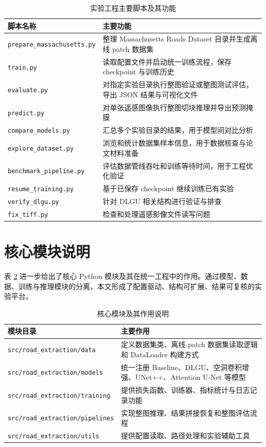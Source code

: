 \begin{table}[htbp]
\centering
\caption{实验工程主要脚本及其功能}
\label{tab:v2-script-summary}
\begin{tabular}{p{4.0cm}p{9.0cm}}
\toprule
脚本名称 & 主要功能 \\
\midrule
\texttt{prepare\_massachusetts.py} & 整理 Massachusetts Roads Dataset 目录并生成离线 patch 数据集 \\
\texttt{train.py} & 读取配置文件并启动统一训练流程，保存 checkpoint 与训练历史 \\
\texttt{evaluate.py} & 对指定实验目录执行整图验证或整图测试评估，导出 JSON 结果与可视化文件 \\
\texttt{predict.py} & 对单张遥感图像执行整图切块推理并导出预测掩膜 \\
\texttt{compare\_models.py} & 汇总多个实验目录的结果，用于模型间对比分析 \\
\texttt{explore\_dataset.py} & 浏览和统计数据集样本信息，用于数据核查与论文材料准备 \\
\texttt{benchmark\_pipeline.py} & 评估数据管线吞吐和训练等待时间，用于工程优化验证 \\
\texttt{resume\_training.py} & 基于已保存 checkpoint 继续训练已有实验 \\
\texttt{verify\_dlgu.py} & 针对 DLGU 相关结构进行验证与排查 \\
\texttt{fix\_tiff.py} & 检查和处理遥感影像文件读写问题 \\
\bottomrule
\end{tabular}
\end{table}

\section{核心模块说明}
表 \ref{tab:v2-module-summary} 进一步给出了核心 Python 模块及其在统一工程中的作用。通过模型、数据、训练与推理模块的分离，本文形成了配置驱动、结构可扩展、结果可复核的实验平台。

\begin{table}[htbp]
\centering
\caption{核心模块及其作用说明}
\label{tab:v2-module-summary}
\begin{tabular}{p{3.8cm}p{9.2cm}}
\toprule
模块目录 & 主要作用 \\
\midrule
\texttt{src/road\_extraction/data} & 定义数据集类、离线 patch 数据集读取逻辑和 DataLoader 构建方式 \\
\texttt{src/road\_extraction/models} & 统一注册 Baseline、DLGU、空洞卷积增强、UNet++、Attention U-Net 等模型 \\
\texttt{src/road\_extraction/training} & 提供损失函数、训练器、指标统计与日志记录功能 \\
\texttt{src/road\_extraction/pipelines} & 实现整图推理、结果拼接恢复和整图评估流程 \\
\texttt{src/road\_extraction/utils} & 提供配置读取、路径处理和实验辅助工具 \\
\bottomrule
\end{tabular}
\end{table}

